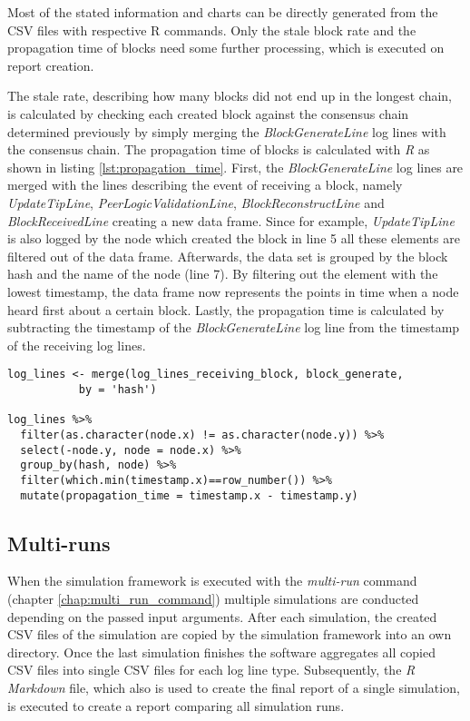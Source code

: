 Most of the stated information and charts can be directly generated from the CSV files with respective R commands.
Only the stale block rate and the propagation time of blocks need some further processing, which is executed on report creation.

The stale rate, describing how many blocks did not end up in the longest chain, is calculated by checking each created block against the consensus chain determined previously by simply merging the \textit{BlockGenerateLine} log lines with the consensus chain.
The propagation time of blocks is calculated with \textit{R} as shown in listing \ref{lst:propagation_time}.
First, the \textit{BlockGenerateLine} log lines are merged with the lines describing the event of receiving a block, namely	\textit{UpdateTipLine}, \textit{PeerLogicValidationLine}, \textit{BlockReconstructLine} and \textit{BlockReceivedLine} creating a new data frame.
Since for example, \textit{UpdateTipLine} is also logged by the node which created the block in line 5 all these elements are filtered out of the data frame.
Afterwards, the data set is grouped by the block hash and the name of the node (line 7).
By filtering out the element with the lowest timestamp, the data frame now represents the points in time when a node heard first about a certain block.
Lastly, the propagation time is calculated by subtracting the timestamp of the \textit{BlockGenerateLine} log line from the timestamp of the receiving log lines.

\begin{minipage}{\linewidth}
\begin{lstlisting}[caption=Calculation of propagation time with \textit{R}, label={lst:propagation_time}, basicstyle=\ttfamily, captionpos=b]
log_lines <- merge(log_lines_receiving_block, block_generate,
		   by = 'hash')

log_lines %>%
  filter(as.character(node.x) != as.character(node.y)) %>%
  select(-node.y, node = node.x) %>%
  group_by(hash, node) %>%
  filter(which.min(timestamp.x)==row_number()) %>%
  mutate(propagation_time = timestamp.x - timestamp.y)
\end{lstlisting}
\end{minipage}
 
\subsection{Multi-runs}

When the simulation framework is executed with the \textit{multi-run} command (chapter \ref{chap:multi_run_command}) multiple simulations are conducted depending on the passed input arguments.
After each simulation, the created CSV files of the simulation are copied by the simulation framework into an own directory.
Once the last simulation finishes the software aggregates all copied CSV files into single CSV files for each log line type.
Subsequently, the \textit{R Markdown} file, which also is used to create the final report of a single  simulation, is executed to create a report comparing all simulation runs.
 
